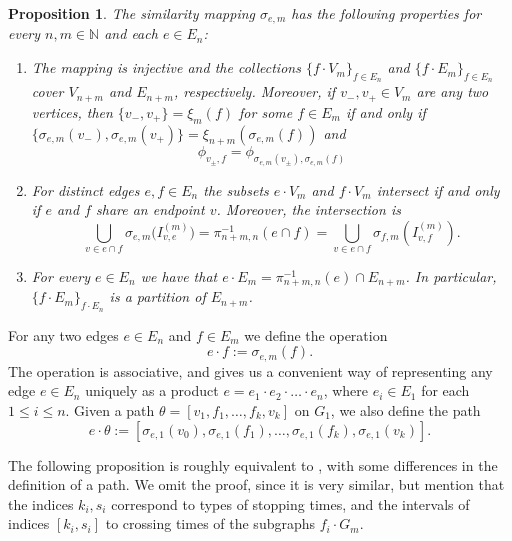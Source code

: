 \documentclass{amsart}
\newtheorem{proposition}[equation]{Proposition}
\numberwithin{equation}{section}
\theoremstyle{definition}
\theoremstyle{remark}
\newcommand{\N}{\mathbb{N}}
\begin{document}
\begin{proposition}\label{prop: similarity maps}
    The similarity mapping \(\sigma_{e,m}\) has the following properties for every \(n,m\in \N\) and each \(e\in E_n\):


    \begin{enumerate}[label={\color{blue}{\textup{$($SM\arabic*}$)$}}, widest=a, leftmargin=*]
        \item\label{SM1} The mapping is injective and the collections \(\{f\cdot V_m\}_{f\in E_n}\) and \(\{f\cdot E_m\}_{f\in E_n}\) cover \(V_{n+m}\) and \(E_{n+m}\), respectively. Moreover, if \(v_-,v_+\in V_m\) are any two vertices, then \(\{v_-,v_+\}=\xi_m(f)\) for some \(f\in E_m\) if and only if \(\{\sigma_{e,m}(v_-),\sigma_{e,m}(v_+)\}=\xi_{n+m}(\sigma_{e,m}(f))\) and 
            \[
            \phi_{v_\pm,f}=\phi_{\sigma_{e,m}(v_\pm),\sigma_{e,m}(f)}
            \]
        \item\label{SM2} For distinct edges \(e,f\in E_n\) the subsets \(e\cdot V_m\) and \(f\cdot V_m\) intersect if and only if \(e\) and \(f\) share an endpoint \(v\). Moreover, the intersection is
            \[
            \bigcup_{v\in e\cap f}\sigma_{e,m}\big(I_{v,e}^{(m)}\big)=\pi_{n+m,n}^{-1}(e\cap f)=\bigcup_{v\in e\cap f} \sigma_{f,m}(I_{v,f}^{(m)}).
            \]
        \item\label{SM3} For every \(e\in E_n\) we have that \(e\cdot E_m=\pi_{n+m,n}^{-1}(e)\cap E_{n+m}\). In particular, \(\{f\cdot E_m\}_{f\cdot E_n}\) is a partition of \(E_{n+m}\).
    \end{enumerate}
\end{proposition}

For any two edges \(e\in E_n\) and \(f\in E_m\) we define the operation
        \[
            e\cdot f:=\sigma_{e,m}(f).
        \]
The operation is associative, and gives us a convenient way of representing any edge \(e\in E_n\) uniquely as a product \(e=e_1\cdot e_2\cdot \ldots \cdot e_n\), where \(e_i\in E_1\) for each \(1\leq i\leq n\). Given a path \(\theta=[v_1,f_1,\ldots, f_k,v_k]\) on \(G_1\), we also define the path
    \[
        e\cdot \theta:=[\sigma_{e,1}(v_0),\sigma_{e,1}(f_1),\ldots,\sigma_{e,1}(f_k),\sigma_{e,1}(v_k)].
    \]


The following proposition is roughly equivalent to \cite[Proposition 3.16]{anttila2024constructions}, with some differences in the definition of a path. We omit the proof, since it is very similar, but mention that the indices $k_i,s_i$ correspond to types of stopping times, and the intervals of indices $[k_i,s_i]$ to crossing times of the subgraphs $f_i\cdot G_m$. 
\end{document}
